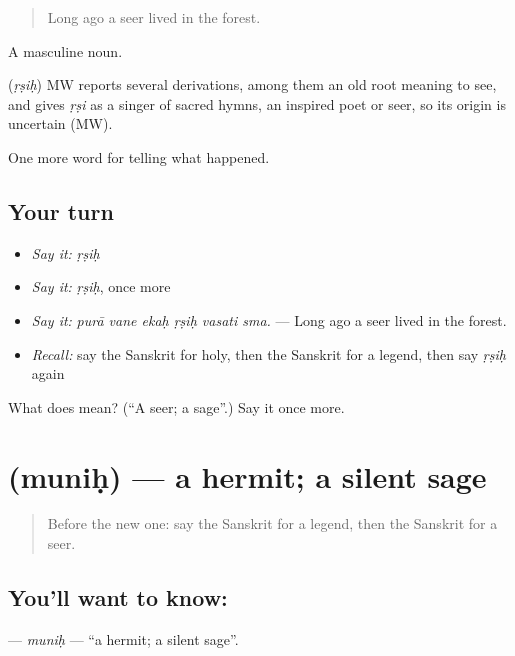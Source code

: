 \begin{quote}
Long ago a seer lived in the forest.
\end{quote}

A masculine noun.

\begin{cousinweb}
\textbf{} (\emph{ṛṣiḥ}) MW reports several derivations, among them an old root meaning to see, and gives \emph{ṛṣi} as a singer of sacred hymns, an inspired poet or seer, so its origin is uncertain (MW).
\end{cousinweb}

\begin{grammarlens}[title={What you've built}]
One more word for telling what happened.
\end{grammarlens}

\subsection*{Your turn}
\begin{itemize}
\raggedright
  \item \emph{Say it:} \emph{ṛṣiḥ}
  \item \emph{Say it:} \emph{ṛṣiḥ}, once more
  \item \emph{Say it:} \emph{purā vane ekaḥ ṛṣiḥ vasati sma.} — Long ago a seer lived in the forest.
  \item \emph{Recall:} say the Sanskrit for holy, then the Sanskrit for a legend, then say \emph{ṛṣiḥ} again
\end{itemize}

\begin{tcolorbox}[breakable,colback=teal!4,colframe=teal!35!black,title={Before you move on}]
What does  mean? (\textquotedblleft{}A seer; a sage\textquotedblright{}.) Say it once more.
\end{tcolorbox}
\section[\texorpdfstring{\sk{मुनिः} (muniḥ)}{मुनिः (muniḥ)}]{ (muniḥ) — a hermit; a silent sage}

\label{lesson:SA-C332-munih}



\begin{quote}
Before the new one: say the Sanskrit for a legend, then the Sanskrit for a seer.
\end{quote}

\subsection*{You'll want to know: }
\textbf{} — \emph{muniḥ} — \textquotedblleft{}a hermit; a silent sage\textquotedblright{}.

